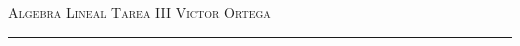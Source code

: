 \documentclass[12pt]{article}
\begin{document}
\thispagestyle{empty}

{\scshape Algebra Lineal} \hfill {\scshape \large Tarea III} \hfill {\scshape Victor Ortega}
 
\smallskip

\hrule

\bigskip

\bigskip

\theoremstyle{definition}
\newtheorem*{definition}{Definición}

\theoremstyle{definition}
\newtheorem*{remark}{Observación}

\theoremstyle{definition}
\newtheorem*{dem}{Demostración}

\theoremstyle{definition}
\newtheorem*{notation}{Notación}

\theoremstyle{definition}
\newtheorem*{theorem}{Teorema}

\theoremstyle{definition}
\newtheorem*{lema}{Lema}

\theoremstyle{remark}
\newtheorem*{observation}{Observación}

\theoremstyle{remark}
\newtheorem*{example}{Ejemplo}
\end{document}
